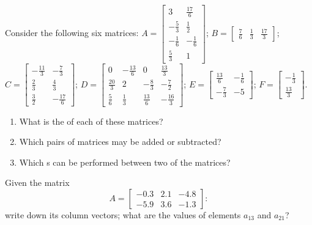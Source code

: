 \begin{reduce}
\begin{exercise}  
Consider the following six matrices:
\(A=\begin{bmatrix} 3&\tfrac{17}{6}
\\-\tfrac{5}{3}&\tfrac{1}{2}
\\-\tfrac{1}{6}&-\tfrac{1}{6}
\\\tfrac{5}{3}&1 \end{bmatrix}\);
\(B=\begin{bmatrix} \tfrac{7}{6}&\tfrac{1}{3}&\tfrac{17}{3} \end{bmatrix}\);
\(C=\begin{bmatrix} -\tfrac{11}{3}&-\tfrac{7}{3}
\\\tfrac{2}{3}&\tfrac{4}{3}
\\\tfrac{3}{2}&-\tfrac{17}{6} \end{bmatrix}\);
\(D=\begin{bmatrix} 0&-\tfrac{13}{6}&0&\tfrac{13}{3}
\\\tfrac{20}{3}&2&-\tfrac{8}{3}&-\tfrac{7}{2}
\\\tfrac{5}{6}&\tfrac{1}{3}&\tfrac{13}{6}&-\tfrac{16}{3} \end{bmatrix}\);
\(E=\begin{bmatrix} \tfrac{13}{6}&-\tfrac{1}{6}
\\-\tfrac{7}{3}&-5 \end{bmatrix}\);
\(F=\begin{bmatrix} -\tfrac{1}{3}
\\\tfrac{13}{3} \end{bmatrix}\).
\begin{enumerate}
\item What is the  of each of these matrices?

\item  Which pairs of matrices may be added or subtracted?

\item  Which s can be performed between two of the matrices?

\end{enumerate}
\end{exercise}
\end{reduce}


\begin{exercise}  
Given the matrix
\begin{equation*}
A=\begin{bmatrix} -0.3&2.1&-4.8
\\  -5.9&3.6&-1.3 \end{bmatrix}:
\end{equation*}
 write down its column vectors; what are the values of elements \(a_{13}\) and \(a_{21}\)?
\end{exercise}


